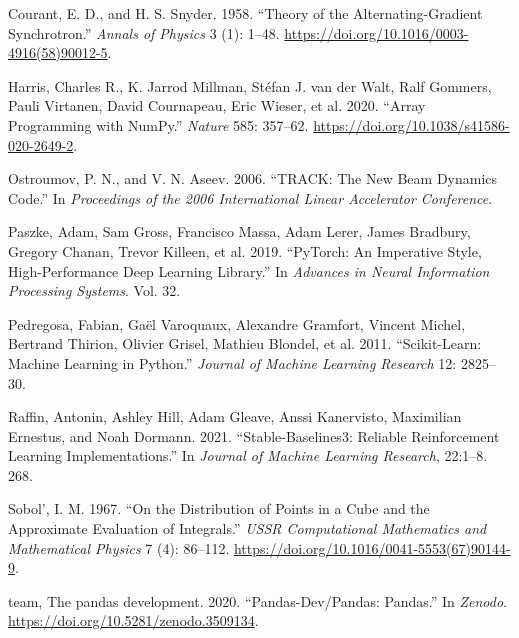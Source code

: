 \documentclass[
]{article}
\newlength{\cslhangindent}
\newlength{\cslentryspacingunit} %
\newenvironment{CSLReferences}[2] %
 {%
  \setlength{\parindent}{0pt}
  \ifodd #1
  \let\oldpar\par
  \def\par{\hangindent=\cslhangindent\oldpar}
  \fi
  \setlength{\parskip}{#2\cslentryspacingunit}
 }%
 {}
\begin{document}
\begin{CSLReferences}{1}{0}
\leavevmode{}%
Courant, E. D., and H. S. Snyder. 1958. {``Theory of the
Alternating-Gradient Synchrotron.''} \emph{Annals of Physics} 3 (1):
1--48. \url{https://doi.org/10.1016/0003-4916(58)90012-5}.

\leavevmode{}%
Harris, Charles R., K. Jarrod Millman, Stéfan J. van der Walt, Ralf
Gommers, Pauli Virtanen, David Cournapeau, Eric Wieser, et al. 2020.
{``Array Programming with NumPy.''} \emph{Nature} 585: 357--62.
\url{https://doi.org/10.1038/s41586-020-2649-2}.

\leavevmode{}%
Ostroumov, P. N., and V. N. Aseev. 2006. {``TRACK: The New Beam Dynamics
Code.''} In \emph{Proceedings of the 2006 International Linear
Accelerator Conference}.

\leavevmode{}%
Paszke, Adam, Sam Gross, Francisco Massa, Adam Lerer, James Bradbury,
Gregory Chanan, Trevor Killeen, et al. 2019. {``PyTorch: An Imperative
Style, High-Performance Deep Learning Library.''} In \emph{Advances in
Neural Information Processing Systems}. Vol. 32.

\leavevmode{}%
Pedregosa, Fabian, Gaël Varoquaux, Alexandre Gramfort, Vincent Michel,
Bertrand Thirion, Olivier Grisel, Mathieu Blondel, et al. 2011.
{``Scikit-Learn: Machine Learning in Python.''} \emph{Journal of Machine
Learning Research} 12: 2825--30.

\leavevmode{}%
Raffin, Antonin, Ashley Hill, Adam Gleave, Anssi Kanervisto, Maximilian
Ernestus, and Noah Dormann. 2021. {``Stable-Baselines3: Reliable
Reinforcement Learning Implementations.''} In \emph{Journal of Machine
Learning Research}, 22:1--8. 268.

\leavevmode{}%
Sobol', I. M. 1967. {``On the Distribution of Points in a Cube and the
Approximate Evaluation of Integrals.''} \emph{USSR Computational
Mathematics and Mathematical Physics} 7 (4): 86--112.
\url{https://doi.org/10.1016/0041-5553(67)90144-9}.

\leavevmode{}%
team, The pandas development. 2020. {``Pandas-Dev/Pandas: Pandas.''} In
\emph{Zenodo}. \url{https://doi.org/10.5281/zenodo.3509134}.


\end{CSLReferences}
\end{document}
